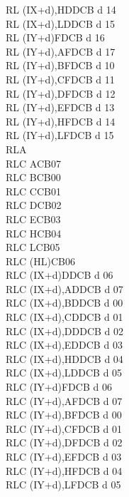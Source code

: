 \begin{multicols}{3}
{\begin{tabbing}
        RL (IX+d),H\UNDOC\>DDCB d 14\\
        RL (IX+d),L\UNDOC\>DDCB d 15\\
        RL (IY+d)\>FDCB d 16\\
        RL (IY+d),A\UNDOC\>FDCB d 17\\
        RL (IY+d),B\UNDOC\>FDCB d 10\\
        RL (IY+d),C\UNDOC\>FDCB d 11\\
        RL (IY+d),D\UNDOC\>FDCB d 12\\
        RL (IY+d),E\UNDOC\>FDCB d 13\\
        RL (IY+d),H\UNDOC\>FDCB d 14\\
        RL (IY+d),L\UNDOC\>FDCB d 15\\
        RLA\\
        RLC A\>CB07\\
        RLC B\>CB00\\
        RLC C\>CB01\\
        RLC D\>CB02\\
        RLC E\>CB03\\
        RLC H\>CB04\\
        RLC L\>CB05\\
        RLC (HL)\>CB06\\
        RLC (IX+d)\>DDCB d 06\\
        RLC (IX+d),A\UNDOC\>DDCB d 07\\
        RLC (IX+d),B\UNDOC\>DDCB d 00\\
        RLC (IX+d),C\UNDOC\>DDCB d 01\\
        RLC (IX+d),D\UNDOC\>DDCB d 02\\
        RLC (IX+d),E\UNDOC\>DDCB d 03\\
        RLC (IX+d),H\UNDOC\>DDCB d 04\\
        RLC (IX+d),L\UNDOC\>DDCB d 05\\
        RLC (IY+d)\>FDCB d 06\\
        RLC (IY+d),A\UNDOC\>FDCB d 07\\
        RLC (IY+d),B\UNDOC\>FDCB d 00\\
        RLC (IY+d),C\UNDOC\>FDCB d 01\\
        RLC (IY+d),D\UNDOC\>FDCB d 02\\
        RLC (IY+d),E\UNDOC\>FDCB d 03\\
        RLC (IY+d),H\UNDOC\>FDCB d 04\\
        RLC (IY+d),L\UNDOC\>FDCB d 05\\

\end{tabbing}}
\end{multicols}
